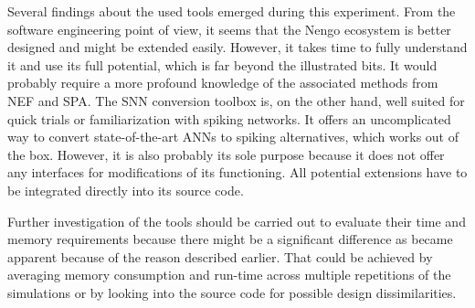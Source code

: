 Several findings about the used tools emerged during this experiment. From the software engineering point of view, it seems that the Nengo ecosystem is better designed and might be extended easily. However, it takes time to fully understand it and use its full potential, which is far beyond the illustrated bits. It would probably require a more profound knowledge of the associated methods from NEF and SPA. The SNN conversion toolbox is, on the other hand, well suited for quick trials or familiarization with spiking networks. It offers an uncomplicated way to convert state-of-the-art ANNs to spiking alternatives, which works out of the box. However, it is also probably its sole purpose because it does not offer any interfaces for modifications of its functioning. All potential extensions have to be integrated directly into its source code. \par
Further investigation of the tools should be carried out to evaluate their time and memory requirements because there might be a significant difference as became apparent because of the reason described earlier. That could be achieved by averaging memory consumption and run-time across multiple repetitions of the simulations or by looking into the source code for possible design dissimilarities.